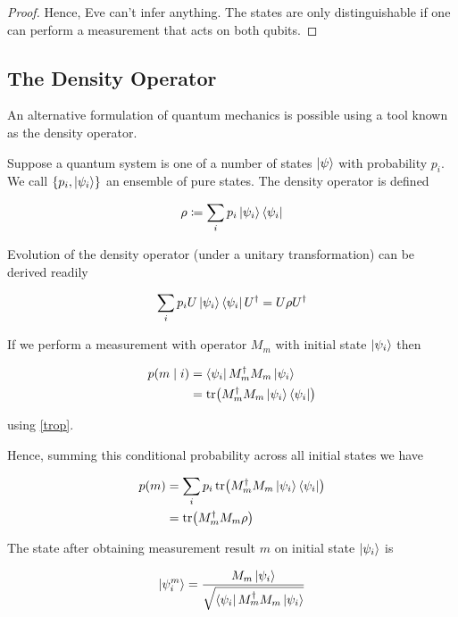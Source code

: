 \documentclass[main.tex]{subfiles}
\begin{document}
\begin{subappendices}
\begin{proof}
	Hence, Eve can't infer anything. The states are only distinguishable if one can perform a measurement that acts on both qubits.  
\end{proof}


\subsection{The Density Operator}

An alternative formulation of quantum mechanics is possible using a tool known as the density operator. 

Suppose a quantum system is one of a number of states $\ket{\psi}$ with probability $p_i$. We call $\{p_i, \ket{\psi_i} \}$ an ensemble of pure states. The density operator is defined

\begin{align*}
\rho \coloneqq \sum_i p_i \ket{\psi_i}\bra{\psi_i}	
\end{align*}

Evolution of the density operator (under a unitary transformation) can be derived readily

\begin{align*}
\sum_i p_i U\ket{\psi_i}\bra{\psi_i}U^\dag = U\rho U^\dag	
\end{align*}

If we perform a measurement with operator $M_m$ with initial state $\ket{\psi_i}$ then

\begin{align*}
p(m\mid i) &= \bra{\psi_i} M_m^\dag M_m \ket{\psi_i} \\
&= \tr(M_m^\dag M_m \ket{\psi_i}\bra{\psi_i})
\end{align*}

using \ref{trop}. 

Hence, summing this conditional probability across all initial states we have

\begin{align*}
	p(m) &= \sum_i p_i \tr(M_m^\dag M_m \ket{\psi_i}\bra{\psi_i}) \\
	&= \tr(M_m^\dag M_m \rho)
\end{align*}

The state after obtaining measurement result $m$ on initial state $\ket{\psi_i}$ is

\begin{align*}
\ket{\psi_i^m} = \frac{M_m \ket{\psi_i}}{\sqrt{\bra{\psi_i}M_m^\dag M_m\ket{\psi_i}}}	
\end{align*}


\end{subappendices}
\end{document}
